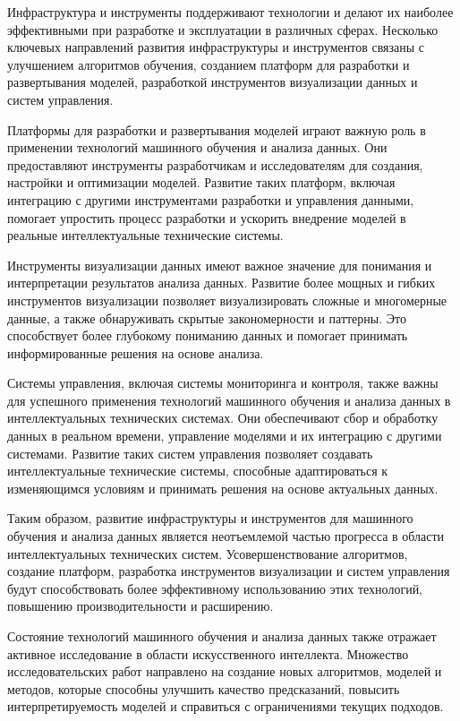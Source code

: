     Инфраструктура и инструменты поддерживают технологии и делают их наиболее эффективными при разработке и эксплуатации в различных сферах. Несколько ключевых направлений развития инфраструктуры и инструментов связаны с улучшением алгоритмов обучения, созданием платформ для разработки и развертывания моделей, разработкой инструментов визуализации данных и систем управления.
    
    Платформы для разработки и развертывания моделей играют важную роль в применении технологий машинного обучения и анализа данных. Они предоставляют инструменты разработчикам и исследователям для создания, настройки и оптимизации моделей. Развитие таких платформ, включая интеграцию с другими инструментами разработки и управления данными, помогает упростить процесс разработки и ускорить внедрение моделей в реальные интеллектуальные технические системы.
    
    Инструменты визуализации данных имеют важное значение для понимания и интерпретации результатов анализа данных. Развитие более мощных и гибких инструментов визуализации позволяет визуализировать сложные и многомерные данные, а также обнаруживать скрытые закономерности и паттерны. Это способствует более глубокому пониманию данных и помогает принимать информированные решения на основе анализа.
    
    Системы управления, включая системы мониторинга и контроля, также важны для успешного применения технологий машинного обучения и анализа данных в интеллектуальных технических системах. Они обеспечивают сбор и обработку данных в реальном времени, управление моделями и их интеграцию с другими системами. Развитие таких систем управления позволяет создавать интеллектуальные технические системы, способные адаптироваться к изменяющимся условиям и принимать решения на основе актуальных данных.
    
    Таким образом, развитие инфраструктуры и инструментов для машинного обучения и анализа данных является неотъемлемой частью прогресса в области интеллектуальных технических систем. Усовершенствование алгоритмов, создание платформ, разработка инструментов визуализации и систем управления будут способствовать более эффективному использованию этих технологий, повышению производительности и расширению.
    
    Состояние технологий машинного обучения и анализа данных также отражает активное исследование в области искусственного интеллекта. Множество исследовательских работ направлено на создание новых алгоритмов, моделей и методов, которые способны улучшить качество предсказаний, повысить интерпретируемость моделей и справиться с ограничениями текущих подходов.
    
